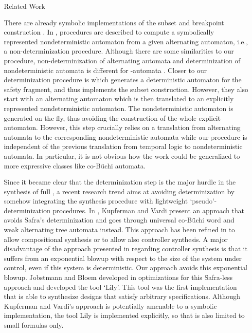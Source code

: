 \documentclass[copyright,creativecommons]{eptcs}
\begin{document}
\begin{section}{Related Work}

\label{RelatedWork}
There are already symbolic implementations of the subset and breakpoint construction \cite{AEFK05,BCPR06}. In \cite{BCPR06}, procedures are described to compute a symbolically represented nondeterministic automaton from a given alternating automaton, i.e., a non-determinization procedure. Although there are some similarities to our procedure, non-determinization of alternating automata and determinization of nondeterministic automata is different for -automata \cite{TuSc05a}. Closer to our determinization procedure is \cite{AEFK05} which generates a deterministic automaton for the safety fragment, and thus implements the subset construction. However, they also start with an alternating automaton which is then translated to an explicitly represented nondeterministic automaton. The nondeterministic automaton is generated on the fly, thus avoiding the construction of the whole explicit automaton. However, this step crucially relies on a translation from alternating automata to the corresponding nondeterministic automata while our procedure is independent of the previous translation from temporal logic to nondeterministic automata. In particular, it is not obvious how the work \cite{AEFK05} could be generalized to more expressive classes like co-Büchi automata.

Since it became clear that the determinization step is the major hurdle in the synthesis of full , a recent research trend aims at avoiding determinization by somehow integrating the synthesis procedure with lightweight `pseudo'-determinization procedures. In \cite{KuVa05a}, Kupferman and Vardi present an approach that avoids Safra's determinization and goes through universal co-Büchi word and weak alternating tree automata instead. This approach has been refined in \cite{KuPV06} to allow compositional synthesis or to allow also controller synthesis. A major disadvantage of the approach presented in \cite{KuVa05a} regarding controller synthesis is that it suffers from an exponential blowup with respect to the size of the system under control, even if this system is deterministic. Our approach avoids this exponential blowup. Jobstmann and Bloem developed in \cite{JoBl06} optimizations for this Safra-less approach and developed the tool `Lily'. This tool was the first implementation that is able to synthesize designs that satisfy arbitrary  specifications. Although Kupferman and Vardi's approach is potentially amenable to a symbolic implementation, the tool Lily is implemented explicitly, so that is also limited to small  formulas only.


\end{section}
\end{document}
